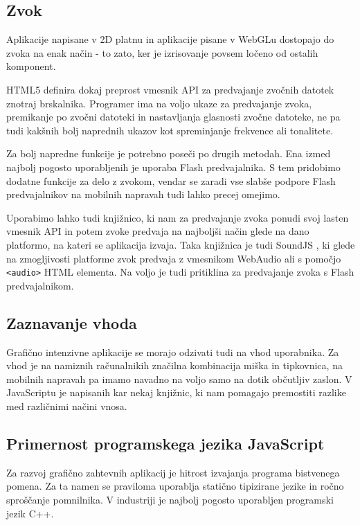\subsection{Zvok}

Aplikacije napisane v 2D platnu in aplikacije pisane v WebGLu dostopajo do zvoka na enak način - to zato, ker je izrisovanje povsem ločeno od ostalih komponent.

HTML5 definira dokaj preprost vmesnik API za predvajanje zvočnih datotek znotraj brskalnika. Programer ima na voljo ukaze za predvajanje zvoka, premikanje po zvočni datoteki in nastavljanja glasnosti zvočne datoteke, ne pa tudi kakšnih bolj naprednih ukazov kot spreminjanje frekvence ali tonalitete.

Za bolj napredne funkcije je potrebno poseči po drugih metodah. Ena izmed najbolj pogosto uporabljenih je uporaba Flash predvajalnika. S tem pridobimo dodatne funkcije za delo z zvokom, vendar se zaradi vse slabše podpore Flash predvajalnikov na mobilnih napravah tudi lahko precej omejimo. 

Uporabimo lahko tudi knjižnico, ki nam za predvajanje zvoka ponudi svoj lasten vmesnik API in potem zvoke predvaja na najboljši način glede na dano platformo, na kateri se aplikacija izvaja. Taka knjižnica je tudi SoundJS \cite{soundjs}, ki glede na zmogljivosti platforme zvok predvaja z vmesnikom WebAudio ali s pomočjo \texttt{<audio>} HTML elementa. Na voljo je tudi pritiklina za predvajanje zvoka s Flash predvajalnikom.
 
\subsection{Zaznavanje vhoda}

Grafično intenzivne aplikacije se morajo odzivati tudi na vhod uporabnika. Za vhod je na namiznih računalnikih značilna kombinacija miška in tipkovnica, na mobilnih napravah pa imamo navadno na voljo samo na dotik občutljiv zaslon. V JavaScriptu je napisanih kar nekaj knjižnic, ki nam pomagajo premostiti razlike med različnimi načini vnosa.

\subsection{Primernost programskega jezika JavaScript}

Za razvoj grafično zahtevnih aplikacij je hitrost izvajanja programa bistvenega pomena. Za ta namen se praviloma uporablja statično tipizirane jezike in ročno sproščanje pomnilnika. V industriji je najbolj pogosto uporabljen programski jezik C++.

